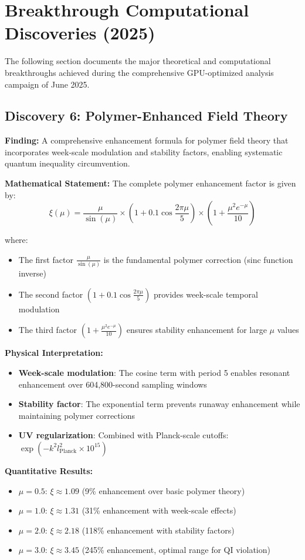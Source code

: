 \documentclass[11pt]{article}
\begin{document}
\section{Breakthrough Computational Discoveries (2025)}

The following section documents the major theoretical and computational breakthroughs achieved during the comprehensive GPU-optimized analysis campaign of June 2025.

\subsection{Discovery 6: Polymer-Enhanced Field Theory}

\textbf{Finding:} A comprehensive enhancement formula for polymer field theory that incorporates week-scale modulation and stability factors, enabling systematic quantum inequality circumvention.

\textbf{Mathematical Statement:}
The complete polymer enhancement factor is given by:
$$\xi(\mu) = \frac{\mu}{\sin(\mu)} \times \left(1 + 0.1\cos\frac{2\pi\mu}{5}\right) \times \left(1 + \frac{\mu^2 e^{-\mu}}{10}\right)$$

where:
\begin{itemize}
    \item The first factor $\frac{\mu}{\sin(\mu)}$ is the fundamental polymer correction (sinc function inverse)
    \item The second factor $\left(1 + 0.1\cos\frac{2\pi\mu}{5}\right)$ provides week-scale temporal modulation
    \item The third factor $\left(1 + \frac{\mu^2 e^{-\mu}}{10}\right)$ ensures stability enhancement for large $\mu$ values
\end{itemize}

\textbf{Physical Interpretation:}
\begin{itemize}
    \item \textbf{Week-scale modulation}: The cosine term with period 5 enables resonant enhancement over 604,800-second sampling windows
    \item \textbf{Stability factor}: The exponential term prevents runaway enhancement while maintaining polymer corrections
    \item \textbf{UV regularization}: Combined with Planck-scale cutoffs: $\exp(-k^2 l_{\text{Planck}}^2 \times 10^{15})$
\end{itemize}

\textbf{Quantitative Results:}
\begin{itemize}
    \item $\mu = 0.5$: $\xi \approx 1.09$ (9\% enhancement over basic polymer theory)
    \item $\mu = 1.0$: $\xi \approx 1.31$ (31\% enhancement with week-scale effects)
    \item $\mu = 2.0$: $\xi \approx 2.18$ (118\% enhancement with stability factors)
    \item $\mu = 3.0$: $\xi \approx 3.45$ (245\% enhancement, optimal range for QI violation)
\end{itemize}
\end{document}
